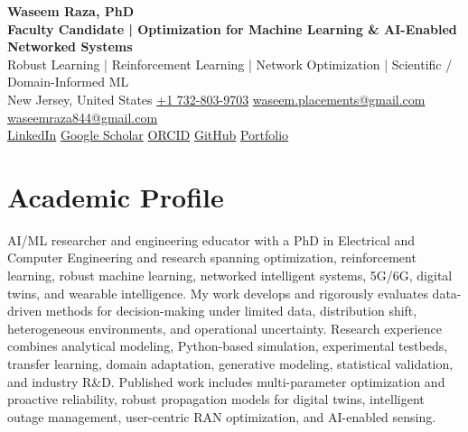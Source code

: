 \documentclass[9pt,letterpaper]{extarticle}
\begin{document}
\begin{center}
{\LARGE\bfseries Waseem Raza, PhD}\\[2pt]
{\large\bfseries Faculty Candidate | Optimization for Machine Learning \& AI-Enabled Networked Systems}\\[1pt]
{\small Robust Learning | Reinforcement Learning | Network Optimization | Scientific / Domain-Informed ML}\\[3pt]
{\footnotesize New Jersey, United States \quad
{}\enspace \href{tel:+17328039703}{+1 732-803-9703} \quad
{}\enspace \href{mailto:waseem.placements@gmail.com}{waseem.placements@gmail.com} \textbar{}
\href{mailto:waseemraza844@gmail.com}{waseemraza844@gmail.com}\\[1pt]
\href{https://www.linkedin.com/in/waseem-raza-phd-9a737858/}{LinkedIn} \textbar{}
\href{https://scholar.google.com/citations?user=d58Drr0AAAAJ&hl=en}{Google Scholar} \textbar{}
\href{https://orcid.org/0000-0002-5544-2637}{ORCID} \textbar{}
\href{https://github.com/WaseemRaza844}{GitHub} \textbar{}
\href{https://waseemraza844.github.io/portfolio/}{Portfolio}}
\end{center}
\vspace{-5pt}

\section{Academic Profile}
AI/ML researcher and engineering educator with a PhD in Electrical and Computer Engineering and research spanning optimization, reinforcement learning, robust machine learning, networked intelligent systems, 5G/6G, digital twins, and wearable intelligence. My work develops and rigorously evaluates data-driven methods for decision-making under limited data, distribution shift, heterogeneous environments, and operational uncertainty. Research experience combines analytical modeling, Python-based simulation, experimental testbeds, transfer learning, domain adaptation, generative modeling, statistical validation, and industry R\&D. Published work includes multi-parameter optimization and proactive reliability, robust propagation models for digital twins, intelligent outage management, user-centric RAN optimization, and AI-enabled sensing.
\end{document}
